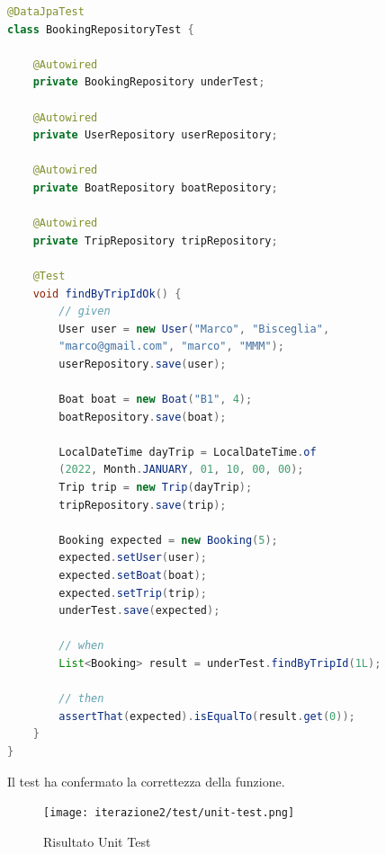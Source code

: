 \begin{lstlisting}[language=Java]
@DataJpaTest
class BookingRepositoryTest {

    @Autowired
    private BookingRepository underTest;

    @Autowired
    private UserRepository userRepository;

    @Autowired
    private BoatRepository boatRepository;

    @Autowired
    private TripRepository tripRepository;

    @Test
    void findByTripIdOk() {
        // given
        User user = new User("Marco", "Bisceglia", 
        "marco@gmail.com", "marco", "MMM");
        userRepository.save(user);

        Boat boat = new Boat("B1", 4);
        boatRepository.save(boat);

        LocalDateTime dayTrip = LocalDateTime.of
        (2022, Month.JANUARY, 01, 10, 00, 00);
        Trip trip = new Trip(dayTrip);
        tripRepository.save(trip);

        Booking expected = new Booking(5);
        expected.setUser(user);
        expected.setBoat(boat);
        expected.setTrip(trip);
        underTest.save(expected);

        // when
        List<Booking> result = underTest.findByTripId(1L);

        // then
        assertThat(expected).isEqualTo(result.get(0));
    }
}
\end{lstlisting}

Il test ha confermato la correttezza della funzione. 

\begin{figure}[htbp]
    \texttt{[image: iterazione2/test/unit-test.png]}
    \centering
    \caption{Risultato Unit Test}
    \label{test Junit findByTripId}
\end{figure}

\clearpage

